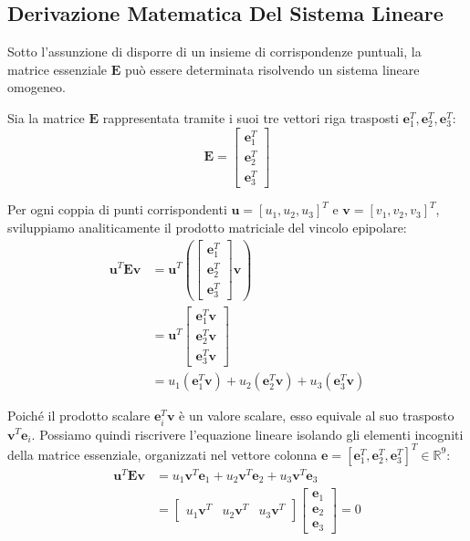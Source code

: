 ﻿\documentclass[11pt, a4paper]{article}
\begin{document}
\subsection{Derivazione Matematica Del Sistema Lineare}
Sotto l'assunzione di disporre di un insieme di corrispondenze puntuali, la matrice essenziale $\bm{E}$ può essere determinata risolvendo un sistema lineare omogeneo.

Sia la matrice $\bm{E}$ rappresentata tramite i suoi tre vettori riga trasposti $\bm{e}_1^T, \bm{e}_2^T, \bm{e}_3^T$:
\[ \bm{E} = \begin{bmatrix} \bm{e}_1^T \\ \bm{e}_2^T \\ \bm{e}_3^T \end{bmatrix} \]

Per ogni coppia di punti corrispondenti $\bm{u} = [u_1, u_2, u_3]^T$ e $\bm{v} = [v_1, v_2, v_3]^T$, sviluppiamo analiticamente il prodotto matriciale del vincolo epipolare:
\begin{align*}
\bm{u}^T \bm{E} \bm{v} &= \bm{u}^T \left( \begin{bmatrix} \bm{e}_1^T \\ \bm{e}_2^T \\ \bm{e}_3^T \end{bmatrix} \bm{v} \right) \\
&= \bm{u}^T \begin{bmatrix} \bm{e}_1^T \bm{v} \\ \bm{e}_2^T \bm{v} \\ \bm{e}_3^T \bm{v} \end{bmatrix} \\
&= u_1 (\bm{e}_1^T \bm{v}) + u_2 (\bm{e}_2^T \bm{v}) + u_3 (\bm{e}_3^T \bm{v})
\end{align*}

Poiché il prodotto scalare $\bm{e}_i^T \bm{v}$ è un valore scalare, esso equivale al suo trasposto $\bm{v}^T \bm{e}_i$. Possiamo quindi riscrivere l'equazione lineare isolando gli elementi incogniti della matrice essenziale, organizzati nel vettore colonna $\bm{e} = [\bm{e}_1^T, \bm{e}_2^T, \bm{e}_3^T]^T \in \mathbb{R}^9$:
\begin{align*}
\bm{u}^T \bm{E} \bm{v} &= u_1 \bm{v}^T \bm{e}_1 + u_2 \bm{v}^T \bm{e}_2 + u_3 \bm{v}^T \bm{e}_3 \\
&= \begin{bmatrix} u_1 \bm{v}^T & u_2 \bm{v}^T & u_3 \bm{v}^T \end{bmatrix} \begin{bmatrix} \bm{e}_1 \\ \bm{e}_2 \\ \bm{e}_3 \end{bmatrix} = 0
\end{align*}
\end{document}
